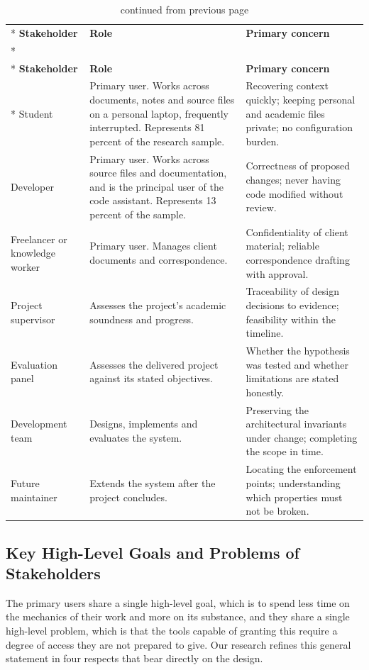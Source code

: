 \documentclass{FastFyp}
\begin{document}
{
\begin{longtable}{|p{3.2cm}|p{5.0cm}|p{5.6cm}|}
\caption{Stakeholders and their concerns.}\label{tab:stakeholders}\\*
\hline
\textbf{Stakeholder} & \textbf{Role} & \textbf{Primary concern} \\*
\hline
\endfirsthead
\caption[]{continued from previous page}\\*
\hline
\textbf{Stakeholder} & \textbf{Role} & \textbf{Primary concern} \\*
\hline
\endhead
\hline
Student & Primary user. Works across documents, notes and source files on a personal laptop, frequently interrupted. Represents 81 percent of the research sample. & Recovering context quickly; keeping personal and academic files private; no configuration burden. \\
\hline
Developer & Primary user. Works across source files and documentation, and is the principal user of the code assistant. Represents 13 percent of the sample. & Correctness of proposed changes; never having code modified without review. \\
\hline
Freelancer or knowledge worker & Primary user. Manages client documents and correspondence. & Confidentiality of client material; reliable correspondence drafting with approval. \\
\hline
Project supervisor & Assesses the project's academic soundness and progress. & Traceability of design decisions to evidence; feasibility within the timeline. \\
\hline
Evaluation panel & Assesses the delivered project against its stated objectives. & Whether the hypothesis was tested and whether limitations are stated honestly. \\
\hline
Development team & Designs, implements and evaluates the system. & Preserving the architectural invariants under change; completing the scope in time. \\
\hline
Future maintainer & Extends the system after the project concludes. & Locating the enforcement points; understanding which properties must not be broken. \\
\hline
\end{longtable}
}

\subsection{Key High-Level Goals and Problems of Stakeholders}
The primary users share a single high-level goal, which is to spend less time on the mechanics of their work and more on its substance, and they share a single high-level problem, which is that the tools capable of granting this require a degree of access they are not prepared to give. Our research refines this general statement in four respects that bear directly on the design.
\end{document}
